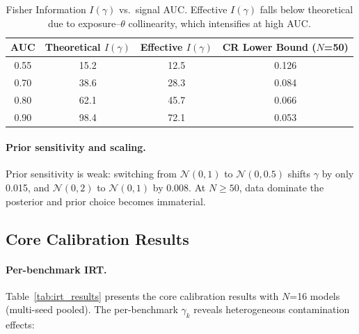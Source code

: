 \documentclass[11pt,a4paper]{article}
\begin{document}
\begin{table}[t]
\centering
\caption{Fisher Information $I(\gamma)$ vs.\ signal AUC. Effective $I(\gamma)$ falls below theoretical due to exposure--$\theta$ collinearity, which intensifies at high AUC.}
\label{tab:fisher}
\small
\begin{tabular}{cccc}
\toprule
AUC & Theoretical $I(\gamma)$ & Effective $I(\gamma)$ & CR Lower Bound ($N$=50) \\
\midrule
0.55 & 15.2 & 12.5 & 0.126 \\
0.70 & 38.6 & 28.3 & 0.084 \\
0.80 & 62.1 & 45.7 & 0.066 \\
0.90 & 98.4 & 72.1 & 0.053 \\
\bottomrule
\end{tabular}
\end{table}

\paragraph{Prior sensitivity and scaling.}
Prior sensitivity is weak: switching from $\mathcal{N}(0,1)$ to $\mathcal{N}(0,0.5)$ shifts $\gamma$ by only 0.015, and $\mathcal{N}(0,2)$ to $\mathcal{N}(0,1)$ by 0.008. At $N\geq50$, data dominate the posterior and prior choice becomes immaterial.

\subsection{Core Calibration Results}
\label{sec:calibration}

\paragraph{Per-benchmark IRT.}
Table~\ref{tab:irt_results} presents the core calibration results with $N$=16 models (multi-seed pooled). The per-benchmark $\gamma_k$ reveals heterogeneous contamination effects:
\end{document}
